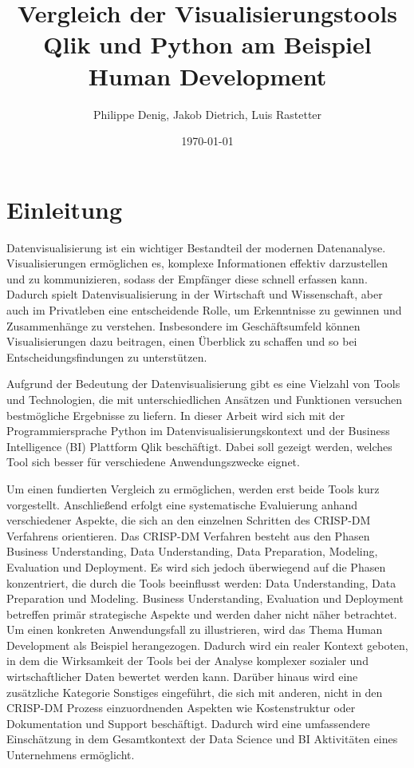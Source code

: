 \documentclass[12pt]{article}
\begin{document}
	
	\title{Vergleich der Visualisierungstools Qlik und Python am Beispiel Human Development}
	\author{Philippe Denig, Jakob Dietrich, Luis Rastetter}
	\date{\today}
	
	\maketitle
	
	\newpage
	
	\tableofcontents
	
	\newpage
	
	
	\section{Einleitung}
	Datenvisualisierung ist ein wichtiger Bestandteil der modernen Datenanalyse. Visualisierungen ermöglichen es, komplexe Informationen effektiv darzustellen und zu kommunizieren, sodass der Empfänger diese schnell erfassen kann. Dadurch spielt Datenvisualisierung in der Wirtschaft und Wissenschaft, aber auch im Privatleben eine entscheidende Rolle, um Erkenntnisse zu gewinnen und Zusammenhänge zu verstehen. Insbesondere im Geschäftsumfeld können Visualisierungen dazu beitragen, einen Überblick zu schaffen und so bei Entscheidungsfindungen zu unterstützen.
	
	Aufgrund der Bedeutung der Datenvisualisierung gibt es eine Vielzahl von Tools und Technologien, die mit unterschiedlichen Ansätzen und Funktionen versuchen bestmögliche Ergebnisse zu liefern. In dieser Arbeit wird sich mit der Programmiersprache Python im Datenvisualisierungskontext und der Business Intelligence (BI) Plattform Qlik beschäftigt. Dabei soll gezeigt werden, welches Tool sich besser für verschiedene Anwendungszwecke eignet.
	
	Um einen fundierten Vergleich zu ermöglichen, werden erst beide Tools kurz vorgestellt. Anschließend erfolgt eine systematische Evaluierung anhand verschiedener Aspekte, die sich an den einzelnen Schritten des CRISP-DM Verfahrens orientieren. Das CRISP-DM Verfahren besteht aus den Phasen Business Understanding, Data Understanding, Data Preparation, Modeling, Evaluation und Deployment. Es wird sich jedoch überwiegend auf die Phasen konzentriert, die durch die Tools beeinflusst werden: Data Understanding, Data Preparation und Modeling. Business Understanding, Evaluation und Deployment betreffen primär strategische Aspekte und werden daher nicht näher betrachtet. Um einen konkreten Anwendungsfall zu illustrieren, wird das Thema Human Development als Beispiel herangezogen. Dadurch wird ein realer Kontext geboten, in dem die Wirksamkeit der Tools bei der Analyse komplexer sozialer und wirtschaftlicher Daten bewertet werden kann. Darüber hinaus wird eine zusätzliche Kategorie Sonstiges eingeführt, die sich mit anderen, nicht in den CRISP-DM Prozess einzuordnenden Aspekten wie Kostenstruktur oder Dokumentation und Support beschäftigt. Dadurch wird eine umfassendere Einschätzung in dem Gesamtkontext der Data Science und BI Aktivitäten eines Unternehmens ermöglicht.
	
\end{document}
